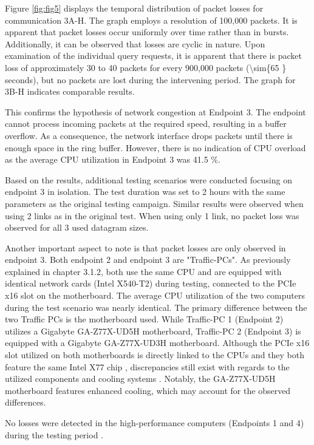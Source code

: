 \documentclass[11pt]{article}
\begin{document}
Figure \ref{fig:fig5} displays the temporal distribution of packet losses for communication 3A-H. The graph employs a resolution of 100,000 packets.  It is apparent that packet losses occur uniformly over time rather than in bursts. Additionally, it can be observed that losses are cyclic in nature. Upon examination of the individual query requests, it is apparent that there is packet loss of approximately 30 to 40 packets for every 900,000 packets (\num{\sim{65 }}  seconds), but no packets are lost during the intervening period. The graph for 3B-H indicates comparable results.

This confirms the hypothesis of network congestion at Endpoint 3. The endpoint cannot process incoming packets at the required speed, resulting in a buffer overflow. As a consequence, the network interface drops packets until there is enough space in the ring buffer. However, there is no indication of CPU overload as the average CPU utilization in Endpoint 3 was 41.5 \%. 

Based on the results, additional testing scenarios were conducted focusing on endpoint 3 in isolation. The test duration was set to 2 hours with the same parameters as the original testing campaign. Similar results were observed when using 2 links as in the original test. When using only 1 link, no packet loss was observed for all 3 used datagram sizes.

Another important aspect to note is that packet losses are only observed in endpoint 3. Both endpoint 2 and endpoint 3 are "Traffic-PCs". As previously explained in chapter 3.1.2, both use the same CPU and are equipped with identical network cards (Intel X540-T2) during testing, connected to the PCIe x16 slot on the motherboard. The average CPU utilization of the two computers during the test scenario was nearly identical. The primary difference between the two Traffic PCs is the motherboard used. While Traffic-PC 1 (Endpoint 2) utilizes a Gigabyte GA-Z77X-UD5H motherboard, Traffic-PC 2 (Endpoint 3) is equipped with a Gigabyte GA-Z77X-UD3H motherboard. Although the PCIe x16 slot utilized on both motherboards is directly linked to the CPUs and they both feature the same Intel X77 chip \cite{tbd}\cite{tbd}, discrepancies still exist with regards to the utilized components and cooling systems \cite{tbd}. Notably, the GA-Z77X-UD5H motherboard features enhanced cooling, which may account for the observed differences.

No losses were detected in the high-performance computers (Endpoints 1 and 4) during the testing period .
\end{document}
